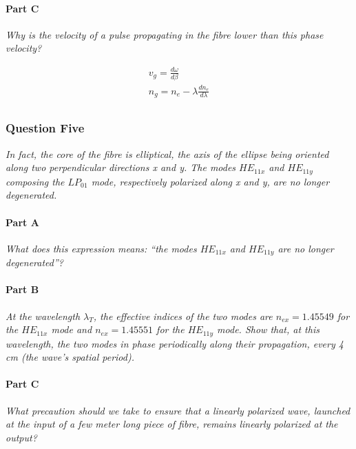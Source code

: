 \documentclass[colorlinks,11pt,a4paper,normalphoto,withhyper,ragged2e]{altareport}
\begin{document}
\paragraph{Part C \linebreak}
\textit{Why is the velocity of a pulse propagating in the fibre lower than this phase velocity?} \linebreak

\begin{gather}
	v_g = \frac{d \omega}{d \beta}\nonumber\\
	n_g = n_e - \lambda \frac{d n_e}{d \lambda}\nonumber\\
\end{gather}



\newpage




\subsubsection{Question Five}
\textit{In fact, the core of the fibre is elliptical, the axis of the ellipse being oriented along two perpendicular directions x and y. The modes $HE_{11x}$ and $HE_{11y}$ composing the $LP_{01}$ mode, respectively polarized along x and y, are no longer degenerated.}




\paragraph{Part A \linebreak}
\textit{What does this expression means: ``the modes $HE_{11x}$ and $HE_{11y}$ are no longer degenerated''?} \linebreak




\paragraph{Part B \linebreak}
\textit{At the wavelength $\lambda_T$, the effective indices of the two modes are $n_{ex}=1.45549$ for the $HE_{11x}$ mode and $n_{ex}=1.45551$ for the $HE_{11y}$ mode. Show that, at this wavelength, the two modes in phase periodically along their propagation, every 4 cm (the wave's spatial period).} \linebreak




\paragraph{Part C \linebreak}
\textit{What precaution should we take to ensure that a linearly polarized wave, launched at the input of a few meter long piece of fibre, remains linearly polarized at the output?} \linebreak
\end{document}
